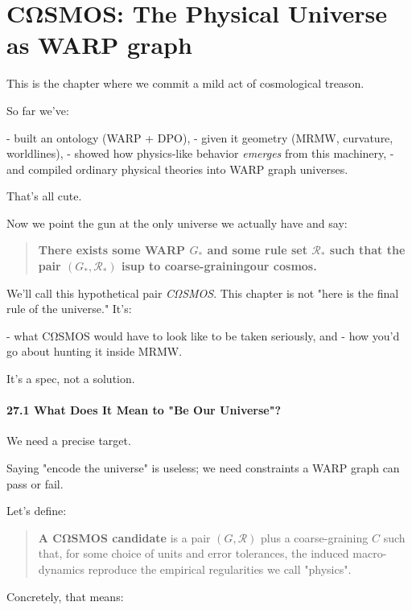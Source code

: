 \chapter{CΩSMOS: The Physical Universe as WARP graph}
\label{sec:cosmos-rmg}

This is the chapter where we commit a mild act of cosmological treason.

So far we’ve:

- built an ontology (WARP + DPO),
- given it geometry (MRMW, curvature, worldlines),
- showed how physics-like behavior \emph{emerges} from this machinery,
- and compiled ordinary physical theories into WARP graph universes.

That’s all cute.

Now we point the gun at the only universe we actually have and say:

\begin{quote}
\textbf{There exists some WARP $G_\ast$ and some rule set $\mathcal{R}_\ast$ such that the pair $(G_\ast, \mathcal{R}_\ast)$ is\emd{}up to coarse-graining\emd{}our cosmos.}
\end{quote}

We’ll call this hypothetical pair \emph{CΩSMOS}. This chapter is not "here is the final rule of the universe." It’s:

- what CΩSMOS would have to look like to be taken seriously, and
- how you’d go about hunting it inside MRMW.

It’s a spec, not a solution.

\subsubsection*{27.1  What Does It Mean to "Be Our Universe"?}

We need a precise target.

Saying "encode the universe" is useless; we need constraints a WARP graph can pass or fail.

Let’s define:

\begin{quote}
\textbf{A CΩSMOS candidate} is a pair $(G,\mathcal{R})$ plus a coarse-graining $C$ such that, for some choice of units and error tolerances, the induced macro-dynamics reproduce the empirical regularities we call "physics".
\end{quote}

Concretely, that means:


